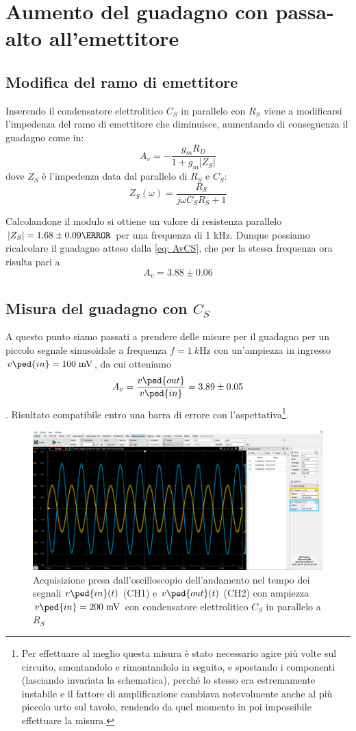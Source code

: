 \documentclass[10pt, a4paper, italian]{article}
\begin{document}
\section{Aumento del guadagno con passa-alto all'emettitore}
\subsection{Modifica del ramo di emettitore}
Inserendo il condensatore elettrolitico $C_S$ in parallelo con $R_S$ viene a
modificarsi l'impedenza del ramo di emettitore che diminuisce, aumentando di
conseguenza il guadagno come in:
\begin{equation}\label{eq: AvCS}
A_v = -\frac{g_m R_D}{1 + g_m |Z_S|}
\end{equation}
dove $Z_S$ è l'impedenza data dal parallelo di $R_S$ e $C_S$:
\begin{equation}
Z_S(\omega) = \frac{R_S}{j\omega C_S R_S +1}
\end{equation}

Calcolandone il modulo si ottiene un valore di resistenza parallelo
$\abs{Z_S} = 1.68 \pm 0.09 \ohm$ per una frequenza di 1 kHz.
Dunque possiamo ricalcolare il guadagno atteso dalla \cref{eq: AvCS}, che
per la stessa frequenza ora risulta pari a
\[
A_v = 3.88 \pm 0.06
\]

\subsection{Misura del guadagno con $C_S$}
A questo punto siamo passati a prendere delle misure per il guadagno per un
piccolo segnale sinusoidale a frequenza $f = \SI{1}{k\Hz}$ con un'ampiezza in
ingresso $v\ped{in} = 100 \; \si{m\V}$, da cui otteniamo
\[
A_v = \frac{v\ped{out}}{v\ped{in}} = 3.89 \pm 0.05
\].
Risultato compatibile entro una barra di errore con l'aspettativa\footnote{
Per effettuare al meglio questa misura è stato necessario agire più volte sul
circuito, smontandolo e rimontandolo in seguito, e spostando i componenti
(lasciando invariata la schematica), perché lo stesso era estremamente
instabile e il fattore di amplificazione cambiava notevolmente anche al più
piccolo urto sul tavolo, rendendo da quel momento in poi impossibile
effettuare la misura.}.
\begin{figure}[htbp]
    \centering
	\includegraphics[width=\textwidth]{amp.200.cap}
    \caption{Acquisizione presa dall'oscilloscopio dell'andamento nel tempo
    dei segnali $v\ped{in} (t)$ (CH1) e $v\ped{out} (t)$ (CH2) con ampiezza
    $v\ped{in} = 200 \; \si{m\V}$ con condensatore elettrolitico $C_S$ in
    parallelo a $R_S$}
\end{figure}
\end{document}
